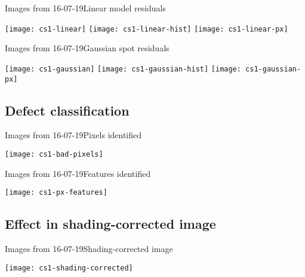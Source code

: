 \documentclass[8pt]{beamer}
\newcommand{\sctriple}{0.11}
\begin{document}

\begin{frame}{Images from 16-07-19}{Linear model residuals}
	\begin{center}
		\texttt{[image: cs1-linear]}
		\texttt{[image: cs1-linear-hist]}
		\texttt{[image: cs1-linear-px]}
	\end{center}
\end{frame}
	

\begin{frame}{Images from 16-07-19}{Gaussian spot residuals}
	\begin{center}
		\texttt{[image: cs1-gaussian]}
		\texttt{[image: cs1-gaussian-hist]}
		\texttt{[image: cs1-gaussian-px]}
	\end{center}
\end{frame}


\subsection{Defect classification}

\begin{frame}{Images from 16-07-19}{Pixels identified}

	\texttt{[image: cs1-bad-pixels]}
	
\end{frame}


\begin{frame}{Images from 16-07-19}{Features identified}

	\texttt{[image: cs1-px-features]}
	
\end{frame}

\subsection{Effect in shading-corrected image}
\begin{frame}{Images from 16-07-19}{Shading-corrected image}
	\begin{center}
		\texttt{[image: cs1-shading-corrected]}
	\end{center}
\end{frame}
\end{document}
